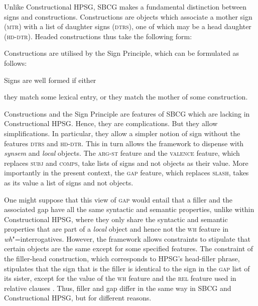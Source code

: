 \documentclass[output=paper
,notxmath 
 	        ,biblatex
                ,babelshorthands
                ,newtxmath
                ,draftmode
                ,colorlinks, citecolor=brown
]{langscibook}
\begin{document}
\begin{sloppypar}
Unlike Constructional HPSG, SBCG makes a fundamental distinction
between signs and constructions. Constructions are objects which
associate a mother sign (\textsc{mtr}) with a list of daughter signs
(\textsc{dtrs}), one of which may be a head daughter
(\textsc{hd-dtr}). Headed constructions thus take the following form:
\end{sloppypar}

\begin{exe}
  \ex \label{ex:UDC:SBCG:cx}

\end{exe}
\noindent
Constructions are utilised by the Sign Principle, which can be
formulated as follows:

\begin{exe}
  \ex \label{ex:UDC:SBCG:SignPrinciple} Signs are well formed if either

  \begin{xlist}
    \ex they match some lexical entry, or \ex they match the mother of
    some construction.
  \end{xlist}
\end{exe}

\noindent
Constructions and the Sign Principle are features of SBCG which
are lacking in Constructional HPSG. Hence, they are
complications. But they allow simplifications. In particular, they
allow a simpler notion of sign without the features \textsc{dtrs} and
\textsc{hd-dtr}. This in turn allows the framework to dispense with
\textit{synsem} and \textit{local} objects. The \textsc{arg-st}
feature and the \textsc{valence} feature, which replaces \textsc{subj}
and \textsc{comps}, take lists of signs and not  objects as
their value. More importantly in the present context, the \textsc{gap}
feature, which replaces \textsc{slash}, takes as its value a list of
signs and not  objects.

One might suppose that this view of \textsc{gap} would entail that a
filler and the associated gap have all the same syntactic and semantic
properties, unlike within Constructional HPSG, where they only
share the syntactic and semantic properties that are part of a
\textit{local} object and hence not the \textsc{wh} feature in
\emph{wh}"=interrogatives. However, the framework allows constraints
to stipulate that certain objects are the same except for some
specified features. The constraint of the filler-head construction,
which corresponds to HPSG’s head-filler phrase, stipulates that the
sign that is the filler is identical to the sign in the \textsc{gap}
list of its sister, except for the value of the \textsc{wh} feature
and the \textsc{rel} feature used in relative clauses \citep[]{Sag:12}. Thus, filler
and gap differ in the same way in SBCG and Constructional HPSG,
but for different reasons.
\end{document}
